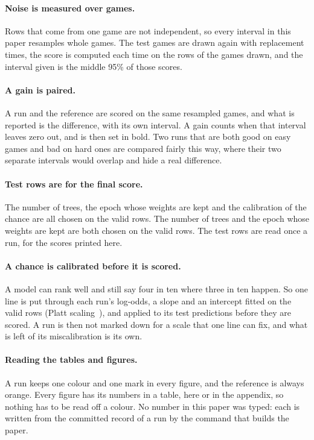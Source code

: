 \paragraph{Noise is measured over games.}
Rows that come from one game are not independent, so every interval in this
paper resamples whole games. The test games are drawn again with replacement
 times, the score is computed each time on the rows of the
games drawn, and the interval given is the middle 95\% of those scores.

\paragraph{A gain is paired.}
A run and the reference are scored on the same resampled games, and what is
reported is the difference, with its own interval. A gain counts when that
interval leaves zero out, and is then set in bold. Two runs that are both good
on easy games and bad on hard ones are compared fairly this way, where their
two separate intervals would overlap and hide a real difference.

\paragraph{Test rows are for the final score.}
\ifchance
The number of trees, the epoch whose weights are kept and the calibration of
the chance are all chosen on the valid rows.
\else
The number of trees and the epoch whose weights are kept are both chosen on
the valid rows.
\fi
The test rows are read once a run, for the scores printed here.

\ifchance
\paragraph{A chance is calibrated before it is scored.}
A model can rank well and still say four in ten where three in ten happen. So
one line is put through each run's log-odds, a slope and an intercept fitted
on the valid rows (Platt scaling~\cite{platt}), and applied to its test
predictions before they are scored. A run is then not marked down for a scale
that one line can fix, and what is left of its miscalibration is its own.
\fi

\paragraph{Reading the tables and figures.}
A run keeps one colour and one mark in every figure, and the reference is
always orange. Every figure has its numbers in a table, here or in the
appendix, so nothing has to be read off a colour. No number in this paper was
typed: each is written from the committed record of a run by the command that
builds the paper.

